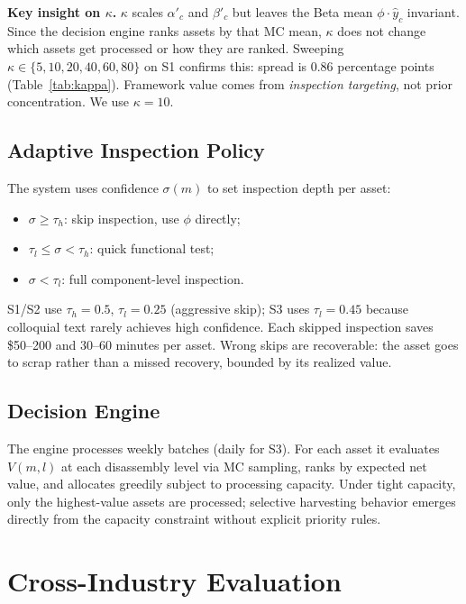 \documentclass[conference]{IEEEtran}
\begin{document}
\smallskip\noindent\textbf{Key insight on $\kappa$.}
$\kappa$ scales $\alpha'_c$ and $\beta'_c$ but leaves the Beta mean
$\phi\cdot\hat{y}_c$ invariant. Since the decision engine ranks assets by that
MC mean, $\kappa$ does not change which assets get processed or how they are
ranked. Sweeping $\kappa\in\{5,10,20,40,60,80\}$ on S1 confirms this:
spread is 0.86 percentage points (Table~\ref{tab:kappa}). Framework value
comes from \emph{inspection targeting}, not prior concentration. We use
$\kappa{=}10$.

\subsection{Adaptive Inspection Policy}

The system uses confidence $\sigma(m)$ to set inspection depth per asset:
\begin{itemize}[noitemsep]
\item $\sigma\geq\tau_h$: skip inspection, use $\phi$ directly;
\item $\tau_l\leq\sigma<\tau_h$: quick functional test;
\item $\sigma<\tau_l$: full component-level inspection.
\end{itemize}
S1/S2 use $\tau_h{=}0.5$, $\tau_l{=}0.25$ (aggressive skip); S3 uses
$\tau_l{=}0.45$ because colloquial text rarely achieves high confidence.
Each skipped inspection saves \$50--200 and 30--60 minutes per asset. Wrong skips
are recoverable: the asset goes to scrap rather than a missed recovery, bounded
by its realized value.

\subsection{Decision Engine}

The engine processes weekly batches (daily for S3). For each asset it evaluates
$V(m,l)$ at each disassembly level via MC sampling, ranks by expected net value,
and allocates greedily subject to processing capacity. Under tight capacity,
only the highest-value assets are processed; selective harvesting behavior
emerges directly from the capacity constraint without explicit priority rules.

\section{Cross-Industry Evaluation}
\end{document}
